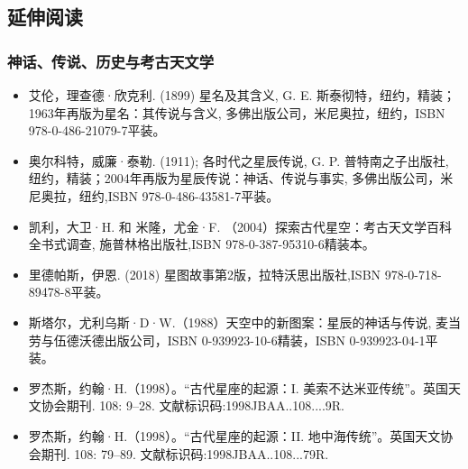 \subsection{延伸阅读}
\subsubsection{神话、传说、历史与考古天文学}
\begin{itemize}
\item 艾伦，理查德·欣克利. (1899) 星名及其含义, G. E. 斯泰彻特，纽约，精装；1963年再版为星名：其传说与含义, 多佛出版公司，米尼奥拉，纽约，ISBN 978-0-486-21079-7平装。
\item 奥尔科特，威廉·泰勒. (1911); 各时代之星辰传说, G. P. 普特南之子出版社, 纽约，精装；2004年再版为星辰传说：神话、传说与事实, 多佛出版公司，米尼奥拉，纽约,ISBN 978-0-486-43581-7平装。
\item 凯利，大卫·H. 和 米隆，尤金·F. （2004）探索古代星空：考古天文学百科全书式调查, 施普林格出版社,ISBN 978-0-387-95310-6精装本。
\item 里德帕斯，伊恩. (2018) 星图故事第2版，拉特沃思出版社,ISBN 978-0-718-89478-8平装。
\item 斯塔尔，尤利乌斯·D·W.（1988）天空中的新图案：星辰的神话与传说, 麦当劳与伍德沃德出版公司，ISBN 0-939923-10-6精装，ISBN 0-939923-04-1平装。
\item 罗杰斯，约翰·H.（1998）。“古代星座的起源：I. 美索不达米亚传统”。英国天文协会期刊. 108: 9–28. 文献标识码:1998JBAA..108....9R.
\item 罗杰斯，约翰·H.（1998）。“古代星座的起源：II. 地中海传统”。英国天文协会期刊. 108: 79–89. 文献标识码:1998JBAA..108...79R.
\end{itemize}
